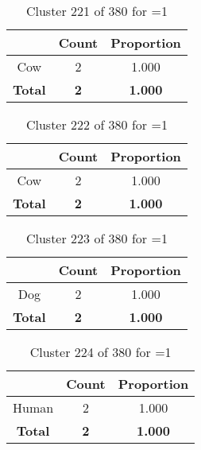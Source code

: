 \begin{table}[ht!]
\centering
\begin{tabular}{|c|c|c|}
\hline
\bf \Spec{} &\bf Count &\bf Proportion\\ \hline \hline
Cow & 2 & 1.000\\ \hline
\hline
\bf Total & \bf 2 & \bf 1.000\\ \hline
\end{tabular}
\label{tab:cluster:221:1}
\caption{Cluster 221 of 380 for \minneigh{}=1}
\end{table}

\begin{table}[ht!]
\centering
\begin{tabular}{|c|c|c|}
\hline
\bf \Spec{} &\bf Count &\bf Proportion\\ \hline \hline
Cow & 2 & 1.000\\ \hline
\hline
\bf Total & \bf 2 & \bf 1.000\\ \hline
\end{tabular}
\label{tab:cluster:222:1}
\caption{Cluster 222 of 380 for \minneigh{}=1}
\end{table}

\begin{table}[ht!]
\centering
\begin{tabular}{|c|c|c|}
\hline
\bf \Spec{} &\bf Count &\bf Proportion\\ \hline \hline
Dog & 2 & 1.000\\ \hline
\hline
\bf Total & \bf 2 & \bf 1.000\\ \hline
\end{tabular}
\label{tab:cluster:223:1}
\caption{Cluster 223 of 380 for \minneigh{}=1}
\end{table}

\begin{table}[ht!]
\centering
\begin{tabular}{|c|c|c|}
\hline
\bf \Spec{} &\bf Count &\bf Proportion\\ \hline \hline
Human & 2 & 1.000\\ \hline
\hline
\bf Total & \bf 2 & \bf 1.000\\ \hline
\end{tabular}
\label{tab:cluster:224:1}
\caption{Cluster 224 of 380 for \minneigh{}=1}
\end{table}

